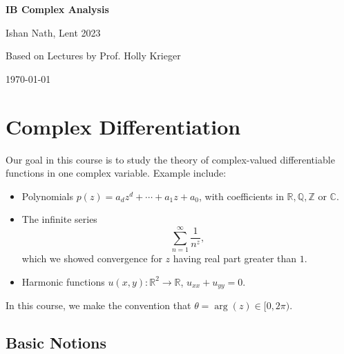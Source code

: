 \documentclass[12pt]{article}
\begin{document}
\hypersetup{pageanchor=false}
\begin{titlepage}
	\begin{center}
		\vspace*{1em}
		\Huge
		\textbf{IB Complex Analysis}

		\vspace{1em}
		\large
		Ishan Nath, Lent 2023

		\vspace{1.5em}

		\Large

		Based on Lectures by Prof. Holly Krieger

		\vspace{1em}

		\large
		\today
	\end{center}
	
\end{titlepage}
\hypersetup{pageanchor=true}

\tableofcontents

\newpage

\section{Complex Differentiation}
\label{sec:complex_differentiation}

Our goal in this course is to study the theory of complex-valued differentiable functions in one complex variable. Example include:
\begin{itemize}
	\item Polynomials $p(z) = a_dz^{d} + \cdots + a_1 z + a_0$, with coefficients in $\mathbb{R}, \mathbb{Q}, \mathbb{Z}$ or $\mathbb{C}$.
	\item The infinite series
		\[
		\sum_{n = 1}^{\infty} \frac{1}{n^{z}}
		,\]
		which we showed convergence for $z$ having real part greater than $1$.
	\item Harmonic functions $u(x, y) : \mathbb{R}^2 \to \mathbb{R}$, $u_{xx} + u_{yy} = 0$.
\end{itemize}

In this course, we make the convention that $\theta = \arg(z) \in [0, 2\pi)$.

\subsection{Basic Notions}
\label{sub:basic_notions}
\end{document}
